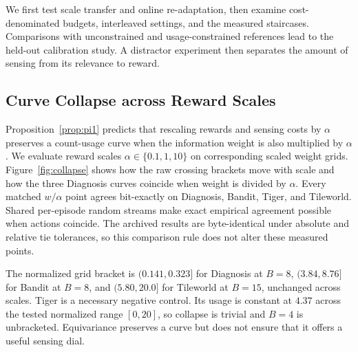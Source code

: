\documentclass[manuscript, screen, review]{jair}
\begin{document}
We first test scale transfer and online re-adaptation, then examine cost-denominated budgets, interleaved settings, and the measured staircases. Comparisons with unconstrained and usage-constrained references lead to the held-out calibration study. A distractor experiment then separates the amount of sensing from its relevance to reward.

\subsection{Curve Collapse across Reward Scales}
\label{sec:collapse}

Proposition~\ref{prop:pi1} predicts that rescaling rewards and sensing costs by $\alpha$ preserves a count-usage curve when the information weight is also multiplied by $\alpha$. We evaluate reward scales $\alpha\in\{0.1,1,10\}$ on corresponding scaled weight grids. Figure~\ref{fig:collapse} shows how the raw crossing brackets move with scale and how the three Diagnosis curves coincide when weight is divided by $\alpha$. Every matched $w/\alpha$ point agrees bit-exactly on Diagnosis, Bandit, Tiger, and Tileworld. Shared per-episode random streams make exact empirical agreement possible when actions coincide. The archived results are byte-identical under absolute and relative tie tolerances, so this comparison rule does not alter these measured points.

The normalized grid bracket is $(0.141,0.323]$ for Diagnosis at $B{=}8$, $(3.84,8.76]$ for Bandit at $B{=}8$, and $(5.80,20.0]$ for Tileworld at $B{=}15$, unchanged across scales. Tiger is a necessary negative control. Its usage is constant at $4.37$ across the tested normalized range $[0,20]$, so collapse is trivial and $B{=}4$ is unbracketed. Equivariance preserves a curve but does not ensure that it offers a useful sensing dial.
\end{document}

